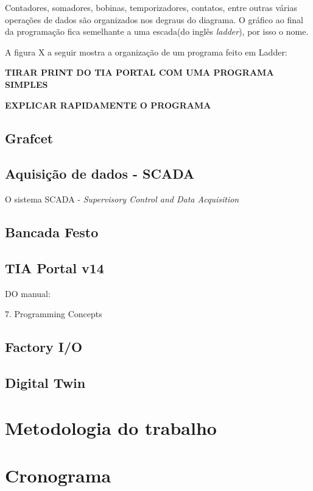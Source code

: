 \documentclass[a4paper, 12pt]{article}
\begin{document}
			Contadores, somadores, bobinas, temporizadores, contatos, entre outras várias
			operações de dados são organizados nos degraus do diagrama.
			O gráfico ao final da programação fica semelhante a uma escada(do inglês \textit{ladder}), por isso o nome.
			
			A figura X a seguir mostra a organização de um programa feito em Ladder:
			
			\textbf{TIRAR PRINT DO TIA PORTAL COM UMA PROGRAMA SIMPLES}
			
			\textbf{EXPLICAR RAPIDAMENTE O PROGRAMA}

	\subsection{Grafcet}

	\subsection{Aquisição de dados - SCADA}
	
		O sistema SCADA - \textit{Supervisory Control and Data Acquisition} 

	\subsection{Bancada Festo}
	
	\subsection{TIA Portal v14}
	
		DO manual:
		
		7. Programming Concepts
	
	\subsection{Factory I/O}
	
	\subsection{Digital Twin}

\section{Metodologia do trabalho}

\section{Cronograma}
\end{document}

